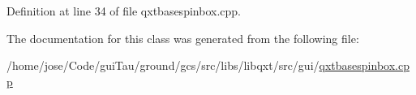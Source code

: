 Definition at line 34 of file qxtbasespinbox.\-cpp.



The documentation for this class was generated from the following file\-:\begin{DoxyCompactItemize}
\item 
/home/jose/\-Code/gui\-Tau/ground/gcs/src/libs/libqxt/src/gui/\hyperlink{qxtbasespinbox_8cpp}{qxtbasespinbox.\-cpp}\end{DoxyCompactItemize}

